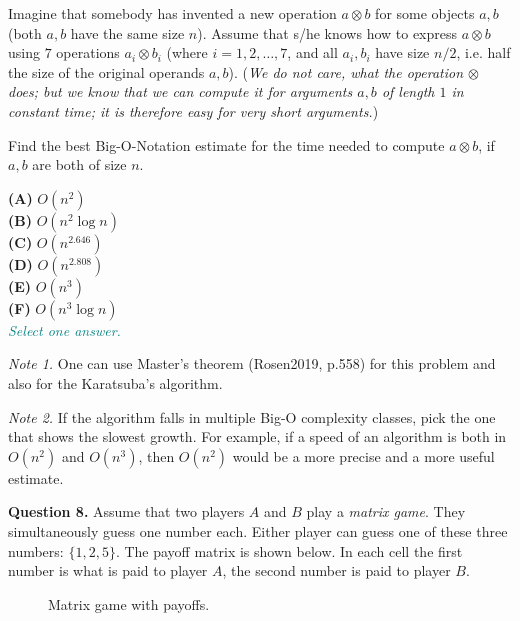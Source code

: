 \documentclass[jou]{apa6}
\begin{document}
Imagine that somebody has invented a new operation $a \otimes b$ for 
some objects $a,b$ (both $a,b$ have the same size $n$). 
Assume that s/he knows how to express 
$a \otimes b$ using $7$ operations $a_i \otimes b_i$ (where $i = 1,2,\ldots,7$, and
all $a_i,b_i$ have size $n/2$, i.e. half the size of the original operands $a,b$). 
({\em We do not care, what the operation $\otimes$ does; but we know that we 
can compute it for arguments $a,b$ of length $1$ in constant time; it is 
therefore easy for very short arguments.})

Find the best Big-O-Notation estimate for the time needed to compute $a \otimes b$, if $a,b$ are
both of size $n$. 

{\bf (A)} $O(n^2)$\\
{\bf (B)} $O(n^2 \log n)$\\
{\bf (C)} $O(n^{2.646})$\\
{\bf (D)} $O(n^{2.808})$\\
{\bf (E)} $O(n^3)$\\
{\bf (F)} $O(n^3 \log n)$\\
\textcolor{teal}{\em Select one answer.}

\vspace{4pt}
{\em Note 1.} One can use Master's theorem (Rosen2019, p.558) for 
this problem and also for the Karatsuba's algorithm.

\vspace{4pt}
{\em Note 2.} If the algorithm falls in multiple Big-O complexity classes, pick 
the one that shows the slowest growth. For example, if a speed of an algorithm is 
both in $O(n^2)$ and $O(n^3)$, 
then $O(n^2)$ would be a more precise and a more useful estimate.


\vspace{10pt}
{\bf Question 8.} Assume that two players $A$ and $B$ play a {\em matrix game}. 
They simultaneously guess one number each. Either player can guess 
one of these three numbers: $\{ 1,2,5 \}$. 
The payoff matrix is shown below. 
In each cell the first number is what is paid to player $A$, 
the second number is paid to player $B$. 

\begin{figure}[!htb]
\caption{\label{fig:matrix-game} Matrix game with payoffs.}
\end{figure}
\end{document}
